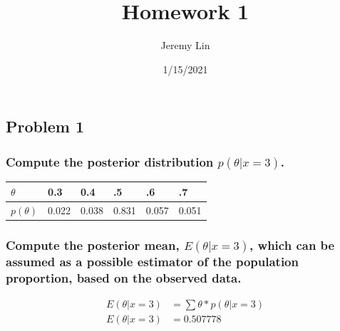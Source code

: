 \documentclass[
]{article}
\title{Homework 1}
\author{Jeremy Lin}
\date{1/15/2021}
\begin{document}
\maketitle

\hypertarget{problem-1}{%
\subsection{Problem 1}\label{problem-1}}

\hypertarget{compute-the-posterior-distribution-pthetax3.}{%
\subsubsection{\texorpdfstring{Compute the posterior distribution
\(p(\theta|x=3)\).}{Compute the posterior distribution p(\textbackslash theta\textbar x=3).}}\label{compute-the-posterior-distribution-pthetax3.}}

\begin{longtable}[]{@{}llllll@{}}
\toprule
\(\theta\) & 0.3 & 0.4 & .5 & .6 & .7\tabularnewline
\midrule
\endhead
\(p(\theta)\) & 0.022 & 0.038 & 0.831 & 0.057 & 0.051\tabularnewline
\bottomrule
\end{longtable}

\hypertarget{compute-the-posterior-mean-ethetax3-which-can-be-assumed-as-a-possible-estimator-of-the-population-proportion-based-on-the-observed-data.}{%
\subsubsection{\texorpdfstring{Compute the posterior mean,
\(E(\theta|x=3)\), which can be assumed as a possible estimator of the
population proportion, based on the observed
data.}{Compute the posterior mean, E(\textbackslash theta\textbar x=3), which can be assumed as a possible estimator of the population proportion, based on the observed data.}}\label{compute-the-posterior-mean-ethetax3-which-can-be-assumed-as-a-possible-estimator-of-the-population-proportion-based-on-the-observed-data.}}

\begin{align}
  E(\theta|x = 3) &= \sum \theta * p(\theta|x = 3) \\
  E(\theta|x = 3) &= 0.507778
\end{align}
\end{document}
